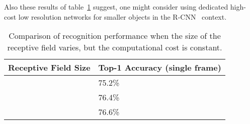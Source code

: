 \documentclass[10pt,twocolumn,letterpaper]{article}
\begin{document}
Also these results of table~\ref{lowrescmp} suggest, one might consider using
dedicated high-cost low resolution networks for smaller objects in the
R-CNN~\cite{girshick2014rcnn} context.

\begin{table}
{
 \begin{center}
   \begin{tabular}[H]{|l|l|}
   \hline
   {\bf Receptive Field Size} & {\bf Top-1 Accuracy (single frame)}\\
   \hline\hline
    & 75.2\% \\
   \hline
    & 76.4\% \\
   \hline
    & 76.6\% \\
   \hline
   \end{tabular}
 \end{center}
 }
\caption{Comparison of recognition performance when the size of the receptive
field varies, but the computational cost is constant.}
\label{lowrescmp}
\end{table}
\end{document}
